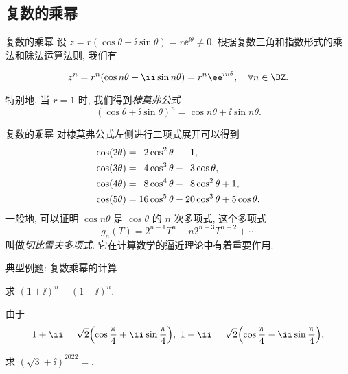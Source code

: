 \subsection{复数的乘幂}

\begin{frame}{复数的乘幂}
	\onslide<+->
	设 $z=r(\cos\theta+\ii\sin\theta)=r\ee^{\ii\theta}\neq0$.
	\onslide<+->
	根据复数三角和指数形式的乘法和除法运算法则, 我们有
	\onslide<+->
	\begin{theorem}[复数的乘幂]
	\[
		z^n=r^n(\cos{n\theta}+\ii\sin{n\theta})=r^n\ee^{in\theta},\quad\forall n\in\BZ.
	\]
	\end{theorem}
	\onslide<+->
	特别地, 当 $r=1$ 时, 我们得到\emph{棣莫弗公式}
	\[(\cos\theta+\ii\sin\theta)^n=\cos{n\theta}+\ii\sin{n\theta}.
	\]
\end{frame}


\begin{frame}{复数的乘幂\noexer}
	\onslide<+->
	对棣莫弗公式左侧进行二项式展开可以得到
	\onslide<+->
	\begin{align*}
		\cos(2\theta)&=\hphantom{1}2\cos^2\theta-\hphantom{1}1,\\
		\cos(3\theta)&=\hphantom{1}4\cos^3\theta-\hphantom{1}3\cos\theta,\\
		\cos(4\theta)&=\hphantom{1}8\cos^4\theta-\hphantom{1}8\cos^2\theta+1,\\
		\cos(5\theta)&=16\cos^5\theta-20\cos^3\theta+5\cos\theta.
	\end{align*}
	\onslide<+->
	一般地, 可以证明 $\cos{n\theta}$ 是 $\cos\theta$ 的 $n$ 次多项式,
	\onslide<+->
	这个多项式
	\[g_n(T)=2^{n-1}T^n-n2^{n-3}T^{n-2}+\cdots
	\]
	叫做\emph{切比雪夫多项式}.
	\onslide<+->
	它在计算数学的逼近理论中有着重要作用.
\end{frame}


\begin{frame}{典型例题: 复数乘幂的计算}
	\onslide<+->
	\begin{example}
		求 $(1+\ii)^n+(1-\ii )^n$.
	\end{example}

	\onslide<+->
	\begin{solution}
		由于
	\[
		1+\ii=\sqrt2\Bigl(\cos\frac\pi4+\ii\sin\frac\pi4\Bigr),\ 
		1-\ii =\sqrt2\Bigl(\cos\frac\pi4-\ii \sin\frac\pi4\Bigr),
	\]
		\onslide<+->{%
			因此
			\[
				(1+\ii)^n+(1-\ii )^n
				=2^{\frac n2}\Bigl(\cos\frac{n\pi}4+\ii\sin\frac{n\pi}4+\cos\frac{n\pi}4-\ii \sin\frac{n\pi}4\Bigr)
				\visible<+->{=2^{\frac n2+1}\cos\frac{n\pi}4.}
	\]
		}\vspace{-\baselineskip}
	\end{solution}

	\onslide<+->
	\begin{exercise}
		求 $(\sqrt3+\ii)^{2022}=$.
	\end{exercise}
\end{frame}


